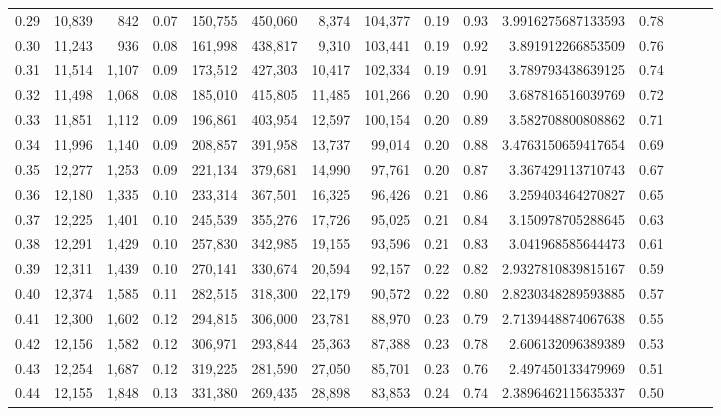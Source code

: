 \begin{tabular}{rrrrrrrrrrrrrrr}
0.29 &  10,839 &    842 &  0.07 &  150,755 &  450,060 &    8,374 &  104,377 &  0.19 &  0.93 &      3.9916275687133593 &      0.78 \\
0.30 &  11,243 &    936 &  0.08 &  161,998 &  438,817 &    9,310 &  103,441 &  0.19 &  0.92 &       3.891912266853509 &      0.76 \\
0.31 &  11,514 &  1,107 &  0.09 &  173,512 &  427,303 &   10,417 &  102,334 &  0.19 &  0.91 &       3.789793438639125 &      0.74 \\
0.32 &  11,498 &  1,068 &  0.08 &  185,010 &  415,805 &   11,485 &  101,266 &  0.20 &  0.90 &       3.687816516039769 &      0.72 \\
0.33 &  11,851 &  1,112 &  0.09 &  196,861 &  403,954 &   12,597 &  100,154 &  0.20 &  0.89 &       3.582708800808862 &      0.71 \\
0.34 &  11,996 &  1,140 &  0.09 &  208,857 &  391,958 &   13,737 &   99,014 &  0.20 &  0.88 &      3.4763150659417654 &      0.69 \\
0.35 &  12,277 &  1,253 &  0.09 &  221,134 &  379,681 &   14,990 &   97,761 &  0.20 &  0.87 &       3.367429113710743 &      0.67 \\
0.36 &  12,180 &  1,335 &  0.10 &  233,314 &  367,501 &   16,325 &   96,426 &  0.21 &  0.86 &       3.259403464270827 &      0.65 \\
0.37 &  12,225 &  1,401 &  0.10 &  245,539 &  355,276 &   17,726 &   95,025 &  0.21 &  0.84 &       3.150978705288645 &      0.63 \\
0.38 &  12,291 &  1,429 &  0.10 &  257,830 &  342,985 &   19,155 &   93,596 &  0.21 &  0.83 &       3.041968585644473 &      0.61 \\
0.39 &  12,311 &  1,439 &  0.10 &  270,141 &  330,674 &   20,594 &   92,157 &  0.22 &  0.82 &      2.9327810839815167 &      0.59 \\
0.40 &  12,374 &  1,585 &  0.11 &  282,515 &  318,300 &   22,179 &   90,572 &  0.22 &  0.80 &      2.8230348289593885 &      0.57 \\
0.41 &  12,300 &  1,602 &  0.12 &  294,815 &  306,000 &   23,781 &   88,970 &  0.23 &  0.79 &      2.7139448874067638 &      0.55 \\
0.42 &  12,156 &  1,582 &  0.12 &  306,971 &  293,844 &   25,363 &   87,388 &  0.23 &  0.78 &       2.606132096389389 &      0.53 \\
0.43 &  12,254 &  1,687 &  0.12 &  319,225 &  281,590 &   27,050 &   85,701 &  0.23 &  0.76 &       2.497450133479969 &      0.51 \\
0.44 &  12,155 &  1,848 &  0.13 &  331,380 &  269,435 &   28,898 &   83,853 &  0.24 &  0.74 &      2.3896462115635337 &      0.50 \\

\end{tabular}
